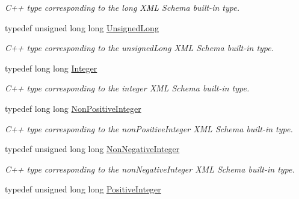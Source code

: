 \begin{DoxyCompactItemize}
\begin{DoxyCompactList}\small\item\em C++ type corresponding to the long XML Schema built-\/in type. \item\end{DoxyCompactList}\item 
\hypertarget{namespacexml__schema_a42f02dabec613faa438d99fac66cb9be}{
typedef unsigned long long \hyperlink{namespacexml__schema_a42f02dabec613faa438d99fac66cb9be}{UnsignedLong}}
\label{namespacexml__schema_a42f02dabec613faa438d99fac66cb9be}

\begin{DoxyCompactList}\small\item\em C++ type corresponding to the unsignedLong XML Schema built-\/in type. \item\end{DoxyCompactList}\item 
\hypertarget{namespacexml__schema_a0b11fbf68a691832669ecf4c77b17782}{
typedef long long \hyperlink{namespacexml__schema_a0b11fbf68a691832669ecf4c77b17782}{Integer}}
\label{namespacexml__schema_a0b11fbf68a691832669ecf4c77b17782}

\begin{DoxyCompactList}\small\item\em C++ type corresponding to the integer XML Schema built-\/in type. \item\end{DoxyCompactList}\item 
\hypertarget{namespacexml__schema_a39aa9881437fa02c71139d9cd3d6085b}{
typedef long long \hyperlink{namespacexml__schema_a39aa9881437fa02c71139d9cd3d6085b}{NonPositiveInteger}}
\label{namespacexml__schema_a39aa9881437fa02c71139d9cd3d6085b}

\begin{DoxyCompactList}\small\item\em C++ type corresponding to the nonPositiveInteger XML Schema built-\/in type. \item\end{DoxyCompactList}\item 
\hypertarget{namespacexml__schema_ad10bc19dd6ff07f4f4f2d6a7105290e7}{
typedef unsigned long long \hyperlink{namespacexml__schema_ad10bc19dd6ff07f4f4f2d6a7105290e7}{NonNegativeInteger}}
\label{namespacexml__schema_ad10bc19dd6ff07f4f4f2d6a7105290e7}

\begin{DoxyCompactList}\small\item\em C++ type corresponding to the nonNegativeInteger XML Schema built-\/in type. \item\end{DoxyCompactList}\item 
\hypertarget{namespacexml__schema_a1e3345b2d2812352f1ee01d3c40499b2}{
typedef unsigned long long \hyperlink{namespacexml__schema_a1e3345b2d2812352f1ee01d3c40499b2}{PositiveInteger}}
\label{namespacexml__schema_a1e3345b2d2812352f1ee01d3c40499b2}


\end{DoxyCompactItemize}
